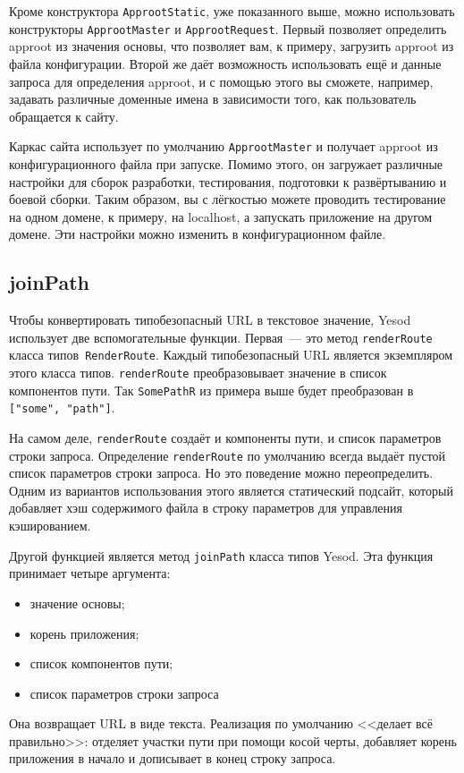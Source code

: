Кроме конструктора \lstinline!ApprootStatic!, уже показанного выше, можно
использовать конструкторы \lstinline!ApprootMaster! и
\lstinline!ApprootRequest!.  Первый позволяет определить approot из значения
основы, что позволяет вам, к примеру, загрузить approot из файла конфигурации.
Второй же даёт возможность использовать ещё и данные запроса для определения
approot, и с помощью этого вы сможете, например, задавать различные доменные
имена в зависимости того, как пользователь обращается к сайту.

Каркас сайта использует по умолчанию \lstinline!ApprootMaster!  и получает
approot из конфигурационного файла при запуске. Помимо этого, он загружает
различные настройки для сборок разработки, тестирования, подготовки к
развёртыванию и боевой сборки. Таким образом, вы с лёгкостью можете проводить
тестирование на одном домене, к примеру, на localhost, а запускать приложение
на другом домене. Эти настройки можно изменить в конфигурационном файле.

\subsection {joinPath}

Чтобы конвертировать типобезопасный URL в текстовое значение, Yesod использует
две вспомогательные функции. Первая~--- это метод \lstinline!renderRoute!
класса типов~\lstinline!RenderRoute!. Каждый типобезопасный URL является
экземпляром этого класса типов. \lstinline!renderRoute! преобразовывает
значение в список компонентов пути. Так \lstinline!SomePathR! из примера выше
будет преобразован в \lstinline!["some", "path"]!.

\begin{remark}
    На самом деле, \lstinline!renderRoute! создаёт и компоненты пути, и список
    параметров строки запроса. Определение \lstinline!renderRoute! по умолчанию
    всегда выдаёт пустой список параметров строки запроса. Но это поведение
    можно переопределить. Одним из вариантов использования этого является
    статический подсайт, который добавляет хэш содержимого файла в строку
    параметров для управления кэшированием.
\end{remark}

Другой функцией является метод \lstinline!joinPath! класса типов Yesod. Эта
функция принимает четыре аргумента:
\begin{itemize}
    \item значение основы;
    \item корень приложения;
    \item список компонентов пути;
    \item список параметров строки запроса
\end{itemize}
Она возвращает URL в виде текста. Реализация по умолчанию <<делает всё
правильно>>: отделяет участки пути при помощи косой черты, добавляет корень
приложения в начало и дописывает в конец строку запроса.

